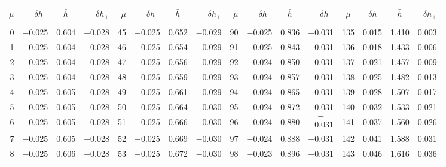 \clearpage
\begin{table}[!h]\centering
\vspace{0.25cm}
\scriptsize{ \begin{tabular}{rrrr|rrrr|rrrr|crrr}
$\mu$ & $\delta h_-$  & $\bar{h}~~~~$ & $\delta h_+$ &
$\mu$ & $\delta h_-$  & $\bar{h}~~~~$ & $\delta h_+$ &
$\mu$ & $\delta h_-$  & $\bar{h}~~~~$ & $\delta h_+$ &
$\mu$ & $\delta h_-$  & $\bar{h}~~~~$ & $\delta h_+$ \\\hline
&&&&&&&&&&&&&&&\\[-1.75ex]
  0 & \tiny{ $-$0.025} &   0.604 & \tiny{ $-$0.028} &  45 & \tiny{ $-$0.025} &   0.652 & \tiny{ $-$0.029} &  90 & \tiny{ $-$0.025} &   0.836 & \tiny{ $-$0.031} & 135 & \tiny{  0.015} &   1.410 & \tiny{  0.003}\\
  1 & \tiny{ $-$0.025} &   0.604 & \tiny{ $-$0.028} &  46 & \tiny{ $-$0.025} &   0.654 & \tiny{ $-$0.029} &  91 & \tiny{ $-$0.025} &   0.843 & \tiny{ $-$0.031} & 136 & \tiny{  0.018} &   1.433 & \tiny{  0.006}\\
  2 & \tiny{ $-$0.025} &   0.604 & \tiny{ $-$0.028} &  47 & \tiny{ $-$0.025} &   0.656 & \tiny{ $-$0.029} &  92 & \tiny{ $-$0.024} &   0.850 & \tiny{ $-$0.031} & 137 & \tiny{  0.021} &   1.457 & \tiny{  0.009}\\
  3 & \tiny{ $-$0.025} &   0.604 & \tiny{ $-$0.028} &  48 & \tiny{ $-$0.025} &   0.659 & \tiny{ $-$0.029} &  93 & \tiny{ $-$0.024} &   0.857 & \tiny{ $-$0.031} & 138 & \tiny{  0.025} &   1.482 & \tiny{  0.013}\\
  4 & \tiny{ $-$0.025} &   0.605 & \tiny{ $-$0.028} &  49 & \tiny{ $-$0.025} &   0.661 & \tiny{ $-$0.029} &  94 & \tiny{ $-$0.024} &   0.865 & \tiny{ $-$0.031} & 139 & \tiny{  0.028} &   1.507 & \tiny{  0.017}\\
  5 & \tiny{ $-$0.025} &   0.605 & \tiny{ $-$0.028} &  50 & \tiny{ $-$0.025} &   0.664 & \tiny{ $-$0.030} &  95 & \tiny{ $-$0.024} &   0.872 & \tiny{ $-$0.031} & 140 & \tiny{  0.032} &   1.533 & \tiny{  0.021}\\
  6 & \tiny{ $-$0.025} &   0.605 & \tiny{ $-$0.028} &  51 & \tiny{ $-$0.025} &   0.666 & \tiny{ $-$0.030} &  96 & \tiny{ $-$0.024} &   0.880 & \tiny{ $$-$$0.031} & 141 & \tiny{  0.037} &   1.560 & \tiny{  0.026}\\
  7 & \tiny{ $-$0.025} &   0.605 & \tiny{ $-$0.028} &  52 & \tiny{ $-$0.025} &   0.669 & \tiny{ $-$0.030} &  97 & \tiny{ $-$0.024} &   0.888 & \tiny{ $-$0.031} & 142 & \tiny{  0.041} &   1.588 & \tiny{  0.031}\\
  8 & \tiny{ $-$0.025} &   0.606 & \tiny{ $-$0.028} &  53 & \tiny{ $-$0.025} &   0.672 & \tiny{ $-$0.030} &  98 & \tiny{ $-$0.023} &   0.896 & \tiny{ $-$0.031} & 143 & \tiny{  0.046} &   1.616 & \tiny{  0.036}\\

\end{tabular}}
\end{table}
